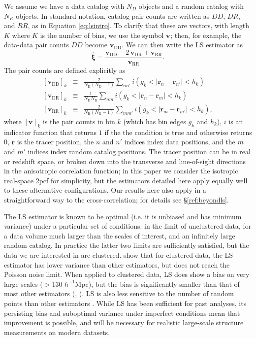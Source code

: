 \documentclass[modern]{aastex62}
\newcommand{\cf}{2pcf\xspace} %
\newcommand{\LS}{LS\xspace}
\newcommand{\hmpc}{$h^{-1}$Mpc}
\newcommand{\bld}[1]{\bm{#1}} %
\newcommand{\vv}[1]{\bld{v}_\mathrm{#1}}
\newcommand{\NN}[1]{N_\mathrm{#1}}
\begin{document}
We assume we have a data catalog with $N_D$ objects and a random catalog with $N_R$ objects.
In standard notation, catalog pair counts are written as $DD$, $DR$, and $RR$, as in Equation \ref{eq:lsintro}.
To clarify that these are vectors, with length $K$ where $K$ is the number of bins, we use the symbol $\vv{}$; then, for example, the data-data pair counts $DD$ become $\vv{DD}$.
We can then write the \LS estimator as 
\begin{equation} \label{eq:lsintro}
    \bld{\hat{\xi}} = \frac{\vv{DD} - 2\,\vv{DR} + \vv{RR}}{\vv{RR}}.
\end{equation}
The pair counts are defined explicitly as
\begin{eqnarray}\displaystyle
\label{eq:ls1}
\left[ \vv{DD} \right]_k &\equiv& \frac{2}{\NN{D}(\NN{D}-1)} \sum_{n n'} i(g_k < |\bld{r}_n - \bld{r}_{n'}| < h_k) \\ 
\left[ \vv{DR} \right]_k &\equiv& \frac{1}{\NN{D} \NN{R}} \sum_{n m} i(g_k < |\bld{r}_n - \bld{r}_m| < h_k) \\
\label{eq:ls3}
\left[ \vv{RR} \right]_k &\equiv& \frac{2}{\NN{R}(\NN{R}-1)} \sum_{m m'} i(g_k < |\bld{r}_m - \bld{r}_{m'}| < h_k),
\end{eqnarray}
where $\left[ \vv{} \right]_k$ is the pair counts in bin $k$ (which has bin edges $g_k$ and $h_k$), $i$ is an indicator function that returns $1$ if the the condition is true and otherwise returns $0$, $\bld{r}$ is the tracer position, the $n$ and $n'$ indices index data positions, and the $m$ and $m'$ indices index random catalog positions.
The tracer position can be in real or redshift space, or broken down into the transverse and line-of-sight directions in the anisotropic correlation function; in this paper we consider the isotropic real-space \cf for simplicity, but the estimators detailed here apply equally well to these alternative configurations.
Our results here also apply in a straightforward way to the cross-correlation; for details see \S\ref{ref:beyondls}. 
 
The \LS estimator is known to be optimal (i.e. it is unbiased and has minimum variance) under a particular set of conditions: in the limit of unclustered data, for a data volume much larger than the scales of interest, and an infinitely large random catalog. 
In practice the latter two limits are sufficiently satisfied, but the data we are interested in are clustered.
\cite{VargasMagana2013} show that for clustered data, the \LS estimator has lower variance than other estimators, but does not reach the Poisson noise limit.
When applied to clustered data, \LS does show a bias on very large scales ($>$130 \hmpc), but the bias is significantly smaller than that of most other estimators (\citealt{Kerscher1999}, \citealt{VargasMagana2013}).
\LS is also less sensitive to the number of random points than other estimators \citep{Kerscher2000}.
While \LS has been sufficient for past analyses, its persisting bias and suboptimal variance under imperfect conditions mean that improvement is possible, and will be necessary for realistic large-scale structure measurements on modern datasets.
\end{document}
